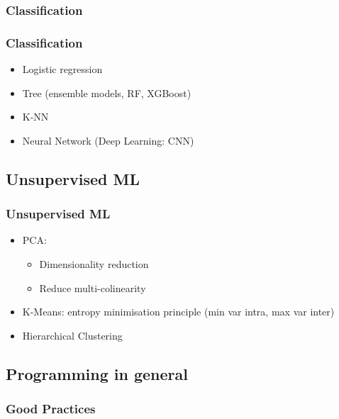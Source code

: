 \subsubsection{Classification}

\begin{frame}\frametitle{Classification}
   \begin{itemize}
      \item Logistic regression
      \item Tree (ensemble models, RF, XGBoost)
      \item K-NN
      \item Neural Network (Deep Learning: CNN)
   \end{itemize}
\end{frame}


\subsection{Unsupervised ML}

\begin{frame}\frametitle{Unsupervised ML}
   \begin{itemize}
      \item PCA:
      \begin{itemize}
         \item Dimensionality reduction
         \item Reduce multi-colinearity
      \end{itemize}
      \item K-Means: entropy minimisation principle (min var intra, max var inter)
      \item Hierarchical Clustering
   \end{itemize}
\end{frame}


\subsection{Programming in general}

\subsubsection{Good Practices}

